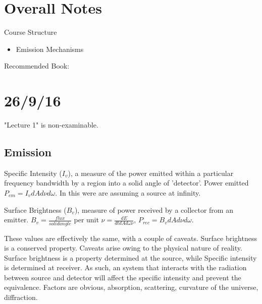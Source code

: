 \documentclass[]{article}
\begin{document}
\large

\section*{Overall Notes}

Course Structure
\begin{itemize}
	\item Emission Mechanisms
\end{itemize}

Recommended Book:

\section{26/9/16}

"Lecture 1" is non-examinable.

\subsection{Emission}

Specific Intensity ($I_v$), a measure of the power emitted within a particular frequency bandwidth by a region into a solid angle of 'detector'. Power emitted $P_{em} = I_vdAd\nu d\omega$. In this were are assuming a source at infinity.

Surface Brightness ($B_v$), measure of power received by a collector from an emitter. $B_v = \frac{flux}{solid angle}$ per unit $\nu = \frac{dE}{dtdAd\omega\nu}$, $P_{rec} = B_vdAd\nu d\omega$.

These values are effectively the same, with a couple of caveats. Surface brightness is a conserved property. Caveats arise owing to the physical nature of reality. Surface brightness is a property determined at the source, while Specific intensity is determined at receiver. As such, an system that interacts with the radiation between source and detector will affect the specific intensity and prevent the equivalence. Factors are obvious, absorption, scattering, curvature of the universe, diffraction.

 
\end{document}
